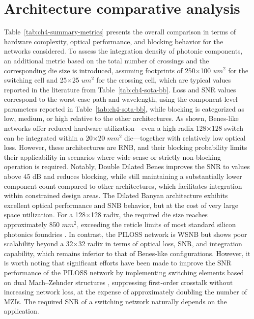 \section{Architecture comparative analysis}\label{sec:architecture_comparison} %
Table~\ref{tab:ch4-summary-metrics} presents the overall comparison in terms of hardware complexity, optical performance, and blocking behavior for the networks considered.
To assess the integration density of photonic components, an additional metric based on the total number of crossings and the corresponding die size is introduced, assuming footprints of 250$\times$100 $um^{2}$ for the switching cell and 25$\times$25 $um^{2}$ for the crossing cell, which are typical values reported in the literature from Table~\ref{tab:ch4-sota-bb}.
Loss and SNR values correspond to the worst-case path and wavelength, using the component-level parameters reported in Table~\ref{tab:ch4-sota-bb}, while blocking is categorized as low, medium, or high relative to the other architectures.
As shown, Benes-like networks offer reduced hardware utilization—even a high-radix 128$\times$128 switch can be integrated within a 20$\times$20 $mm^{2}$ die—together with relatively low optical loss.
However, these architectures are RNB, and their blocking probability limits their applicability in scenarios where wide-sense or strictly non-blocking operation is required.
Notably, Double Dilated Benes improves the SNR to values above 45 dB and reduces blocking, while still maintaining a substantially lower component count compared to other architectures, which facilitates integration within constrained design areas.
The Dilated Banyan architecture exhibits excellent optical performance and SNB behavior, but at the cost of very large space utilization.
For a 128$\times$128 radix, the required die size reaches approximately 850 $mm^{2}$, exceeding the reticle limits of most standard silicon photonics foundries \cite{giewont300mmMonolithicSilicon2019}.
In contrast, the PILOSS network is WSNB but shows poor scalability beyond a 32$\times$32 radix in terms of optical loss, SNR, and integration capability, which remains inferior to that of Benes-like configurations.
However, it is worth noting that significant efforts have been made to improve the SNR performance of the PILOSS network by implementing switching elements based on dual Mach–Zehnder structures \cite{suzukiLargescaleSiliconPhotonics2025a}, suppressing first-order crosstalk without increasing network loss, at the expense of approximately doubling the number of MZIs.
The required SNR of a switching network naturally depends on the application.
